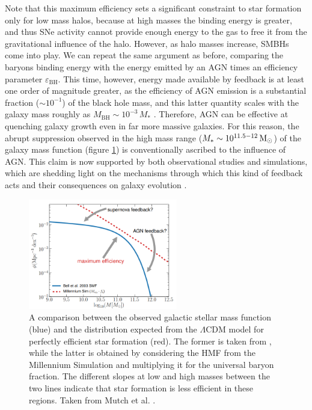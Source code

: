   Note that this maximum efficiency sets a significant constraint to star formation only for low mass halos, because at high masses the binding energy is greater, and thus SNe activity cannot provide enough energy to the gas to free it from the gravitational influence of the halo. However, as halo masses increase, SMBHs come into play. We can repeat the same argument as before, comparing the baryons binding energy with the energy emitted by an AGN times an efficiency parameter $\varepsilon_\mathrm{BH}$. This time, however, energy made available by feedback is at least one order of magnitude greater, as the efficiency of AGN emission is a substantial fraction ($\sim 10^{-1}$) of the black hole mass, and this latter quantity scales with the galaxy mass roughly as $M_\mathrm{BH} \sim 10^{-3}\, M_*$ \citep{Kormendy:2013dxa}. Therefore, AGN can be effective at quenching galaxy growth even in far more massive galaxies. For this reason, the abrupt suppression observed in the high mass range ($M_*\sim 10^{11.5-12}\,{\rm M}_{\odot}$) of the galaxy mass function (figure \ref{fig:halo_stellar}) is conventionally ascribed to the influence of AGN. This claim is now supported by both observational studies and simulations, which are shedding light on the mechanisms through which this kind of feedback acts and their consequences on galaxy evolution \citep{Harrison:2018jvh, Sijacki:2007rw, Hopkins18, Beckmann:2017luq}.
  
\begin{figure}
	\centering
	\includegraphics[width=0.58\textwidth]{plots/feedback.png}
	\caption{A comparison between the observed galactic stellar mass function (blue) and the distribution expected from the $\Lambda\mathrm{CDM}$ model for perfectly efficient star formation (red). The former is taken from \citet{bell2003optical}, while the latter is obtained by considering the HMF from the Millennium Simulation \citep{Springel:2005nw} and multiplying it for the universal baryon fraction.
    The different slopes at low and high masses between the two lines indicate that star formation is less efficient in these regions. Taken from Mutch et al. \citep{mutch2013simplest}.
	}
	\label{fig:halo_stellar}
    \end{figure}
  


